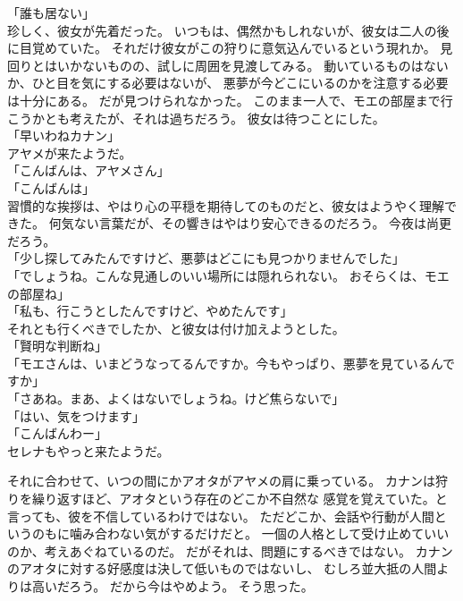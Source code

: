 \documentclass[../IHMain]{subfiles}
\begin{document}
「誰も居ない」\\
珍しく、彼女が先着だった。
いつもは、偶然かもしれないが、彼女は二人の後に目覚めていた。
それだけ彼女がこの狩りに意気込んでいるという現れか。
見回りとはいかないものの、試しに周囲を見渡してみる。
動いているものはないか、ひと目を気にする必要はないが、
悪夢が今どこにいるのかを注意する必要は十分にある。
だが見つけられなかった。
このまま一人で、モエの部屋まで行こうかとも考えたが、それは過ちだろう。
彼女は待つことにした。\\

「早いわねカナン」\\
アヤメが来たようだ。\\
「こんばんは、アヤメさん」\\
「こんばんは」\\
習慣的な挨拶は、やはり心の平穏を期待してのものだと、彼女はようやく理解できた。
何気ない言葉だが、その響きはやはり安心できるのだろう。
今夜は尚更だろう。\\
「少し探してみたんですけど、悪夢はどこにも見つかりませんでした」\\
「でしょうね。こんな見通しのいい場所には隠れられない。
おそらくは、モエの部屋ね」\\
「私も、行こうとしたんですけど、やめたんです」\\
それとも行くべきでしたか、と彼女は付け加えようとした。\\
「賢明な判断ね」\\
「モエさんは、いまどうなってるんですか。今もやっぱり、悪夢を見ているんですか」\\
「さあね。まあ、よくはないでしょうね。けど焦らないで」\\
「はい、気をつけます」\\
「こんばんわー」\\
セレナもやっと来たようだ。

それに合わせて、いつの間にかアオタがアヤメの肩に乗っている。
カナンは狩りを繰り返すほど、アオタという存在のどこか不自然な
感覚を覚えていた。と言っても、彼を不信しているわけではない。
ただどこか、会話や行動が人間というのもに噛み合わない気がするだけだと。
一個の人格として受け止めていいのか、考えあぐねているのだ。
だがそれは、問題にするべきではない。
カナンのアオタに対する好感度は決して低いものではないし、
むしろ並大抵の人間よりは高いだろう。
だから今はやめよう。
そう思った。
\end{document}
